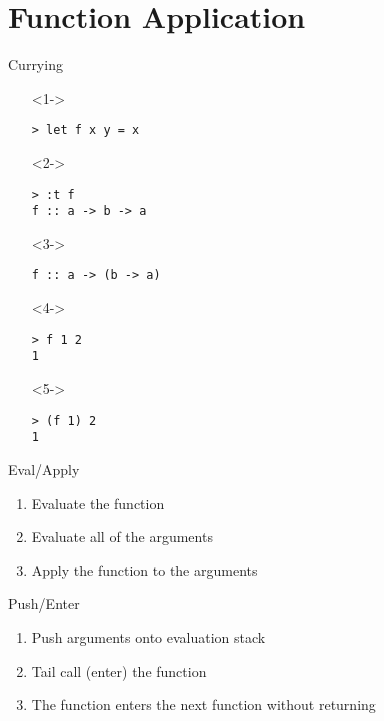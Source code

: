 \documentclass{beamer}
\begin{document}
\section{Function Application}

\begin{frame}[fragile]{Currying}
  \begin{itemize}
  \item[]<1-> \begin{verbatim}
> let f x y = x
    \end{verbatim}
  \item[]<2-> \begin{verbatim}
> :t f
f :: a -> b -> a
    \end{verbatim}
  \item[]<3-> \begin{verbatim}
f :: a -> (b -> a)
    \end{verbatim}
  \item[]<4-> \begin{verbatim}
> f 1 2
1
    \end{verbatim}
  \item[]<5-> \begin{verbatim}
> (f 1) 2
1
    \end{verbatim}
  \end{itemize}
\end{frame}

\begin{frame}{Eval/Apply}
  \begin{enumerate}
  \item<1-> Evaluate the function
  \item<2-> Evaluate all of the arguments
  \item<3-> Apply the function to the arguments
  \end{enumerate}
\end{frame}

\begin{frame}{Push/Enter}
  \begin{enumerate}
  \item<1-> Push arguments onto evaluation stack
  \item<2-> Tail call (enter) the function
  \item<3-> The function enters the next function without returning
  \end{enumerate}
\end{frame}
\end{document}
